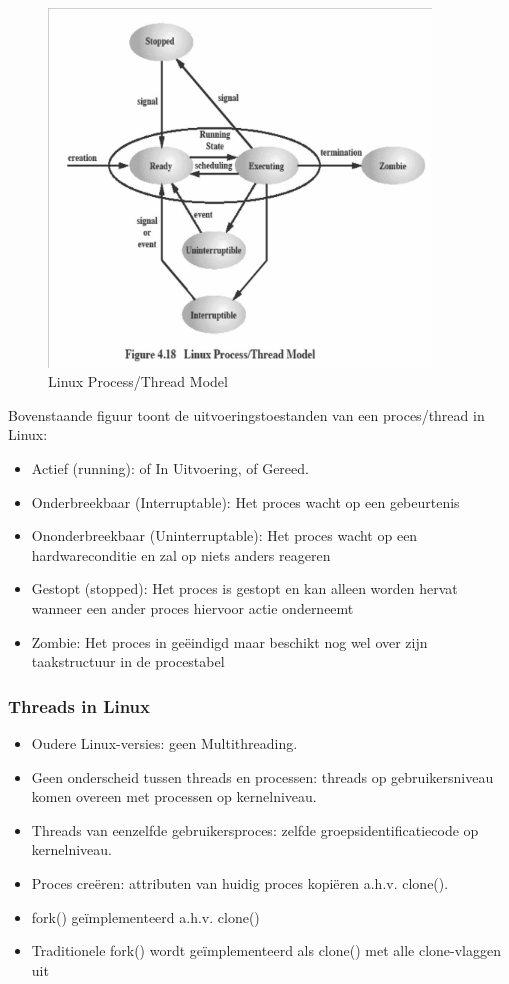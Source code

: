\begin{figure}[htp]
    \centering
            \includegraphics[width=4in]{img/linuxprocessthreadmodel.png}
        \caption{Linux Process/Thread Model}
    \label{fig:Linux Process/Thread Model}
\end{figure}


\newpage


Bovenstaande figuur toont de uitvoeringstoestanden van een proces/thread in Linux:

\begin{itemize}
\item Actief (running): of In Uitvoering, of Gereed.
\item Onderbreekbaar (Interruptable): Het proces wacht op een gebeurtenis
\item Ononderbreekbaar (Uninterruptable): Het proces wacht op een hardwareconditie en zal op niets anders reageren
\item Gestopt (stopped): Het proces is gestopt en kan alleen worden hervat wanneer een ander proces hiervoor actie onderneemt
\item Zombie: Het proces in geëindigd maar beschikt nog wel over zijn taakstructuur in de procestabel
\end{itemize}

\subsubsection{Threads in Linux}

\begin{itemize}
\item Oudere Linux-versies: geen Multithreading.
\item Geen onderscheid tussen threads en processen: threads op gebruikersniveau komen overeen met processen op kernelniveau.
\item Threads van eenzelfde gebruikersproces: zelfde groepsidentificatiecode op kernelniveau.
\item Proces creëren: attributen van huidig proces kopiëren a.h.v. clone().
\item fork() geïmplementeerd a.h.v. clone()
\item Traditionele fork() wordt geïmplementeerd als clone() met alle clone-vlaggen uit
\end{itemize}